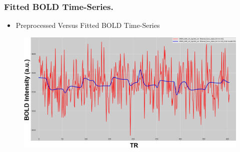 \begin{frame}
\frametitle{Fitted BOLD Time-Series.}
	\begin{itemize}
		\item Preprocessed Versus Fitted BOLD Time-Series
	\end{itemize}
	\begin{figure}
		\centering
		\includegraphics[width=\textwidth]{assets/fitted_and_preproc.png}
	\end{figure}
\end{frame}


